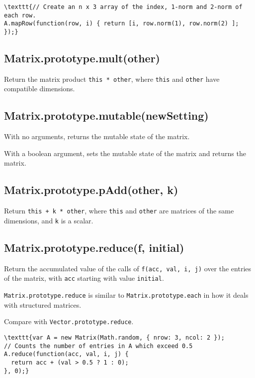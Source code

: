 \documentclass{article}
\begin{document}
\begin{lstlisting}
\texttt{// Create an n x 3 array of the index, 1-norm and 2-norm of each row.
A.mapRow(function(row, i) { return [i, row.norm(1), row.norm(2) ]; });}\end{lstlisting}

    \subsection*{Matrix.prototype.mult(other)}
    Return the matrix product \texttt{this * other}, where \texttt{this} and \texttt{other} have
compatible dimensions.


    \subsection*{Matrix.prototype.mutable(newSetting)}
    With no arguments, returns the mutable state of the matrix.


With a boolean argument, sets the mutable state of the matrix and returns
the matrix.


    \subsection*{Matrix.prototype.pAdd(other, k)}
    Return \texttt{this + k * other}, where \texttt{this} and \texttt{other} are matrices of the
same dimensions, and \texttt{k} is a scalar.


    \subsection*{Matrix.prototype.reduce(f, initial)}
    Return the accumulated value of the calls of \texttt{f(acc, val, i, j)} over the entries
of the matrix, with \texttt{acc} starting with value \texttt{initial}.


\texttt{Matrix.prototype.reduce} is similar to \texttt{Matrix.prototype.each} in how it deals
with structured matrices.


Compare with \texttt{Vector.prototype.reduce}.


\begin{lstlisting}
\texttt{var A = new Matrix(Math.random, { nrow: 3, ncol: 2 });
// Counts the number of entries in A which exceed 0.5
A.reduce(function(acc, val, i, j) {
  return acc + (val > 0.5 ? 1 : 0);
}, 0);}\end{lstlisting}
\end{document}
